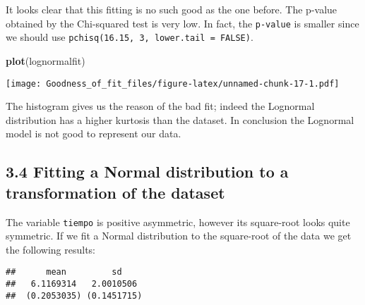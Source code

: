 \documentclass[
]{article}
\newenvironment{Shaded}{\begin{snugshade}}{\end{snugshade}}
\newcommand{\AttributeTok}[1]{\textcolor[rgb]{0.13,0.29,0.53}{#1}}
\newcommand{\ConstantTok}[1]{\textcolor[rgb]{0.56,0.35,0.01}{#1}}
\newcommand{\FunctionTok}[1]{\textcolor[rgb]{0.13,0.29,0.53}{\textbf{#1}}}
\newcommand{\NormalTok}[1]{#1}
\newcommand{\OtherTok}[1]{\textcolor[rgb]{0.56,0.35,0.01}{#1}}
\newcommand{\SpecialCharTok}[1]{\textcolor[rgb]{0.81,0.36,0.00}{\textbf{#1}}}
\newcommand{\StringTok}[1]{\textcolor[rgb]{0.31,0.60,0.02}{#1}}
\begin{document}
It looks clear that this fitting is no such good as the one before. The
p-value obtained by the Chi-squared test is very low. In fact, the
\texttt{p-value} is smaller since we should use
\texttt{pchisq(16.15,\ 3,\ lower.tail\ =\ FALSE)}.

\begin{Shaded}
\begin{Highlighting}[]
\FunctionTok{plot}\NormalTok{(lognormalfit)}
\end{Highlighting}
\end{Shaded}

\texttt{[image: Goodness\_of\_fit\_files/figure-latex/unnamed-chunk-17-1.pdf]}

The histogram gives us the reason of the bad fit; indeed the Lognormal
distribution has a higher kurtosis than the dataset. In conclusion the
Lognormal model is not good to represent our data.

\hypertarget{fitting-a-normal-distribution-to-a-transformation-of-the-dataset}{%
\subsection{3.4 Fitting a Normal distribution to a transformation of the
dataset}\label{fitting-a-normal-distribution-to-a-transformation-of-the-dataset}}

The variable \texttt{tiempo} is positive asymmetric, however its
square-root looks quite symmetric. If we fit a Normal distribution to
the square-root of the data we get the following results:

\begin{Shaded}
\end{Shaded}

\begin{verbatim}
##      mean         sd    
##   6.1169314   2.0010506 
##  (0.2053035) (0.1451715)
\end{verbatim}

\begin{Shaded}
\end{Shaded}
\end{document}
